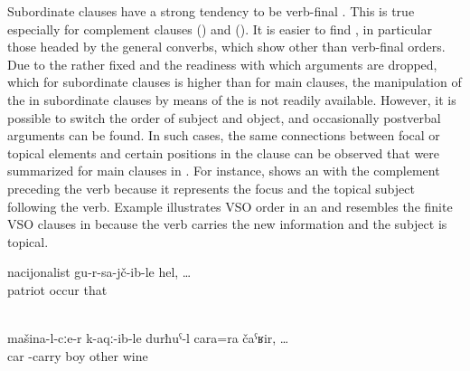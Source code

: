 Subordinate clauses have a strong tendency to be verb-final . This is true especially for complement clauses () and  (). It is easier to find , in particular those headed by the general converbs, which show other than verb-final orders. Due to the rather fixed  and the readiness with which arguments are dropped, which for subordinate clauses is higher than for main clauses, the manipulation of the  in subordinate clauses by means of the  is not readily available. However, it is possible to switch the order of subject and object, and occasionally postverbal arguments can be found. In such cases, the same connections between focal or topical elements and certain positions in the clause can be observed that were summarized for main clauses in . For instance,  shows an  with the  complement preceding the verb because it represents the focus and the topical subject following the verb. Example  illustrates VSO order in an  and resembles the finite VSO clauses in  because the verb carries the new information and the subject is topical.
%
\begin{exe}
	\ex	\label{ex:‎‎‎That (journalist) was a nationalist}
	\gll	nacijonalist	gu-r-sa-jč-ib-le	hel, \ldots\\
		patriot	occur	that\\
	\glt	{}

	\\\label{ex:‎The boy brought another (bottle of) wine from the car}
	\gll	mašina-l-cːe-r	k-aqː-ib-le	durħuˁ-l	cara=ra	čaˁʁir, \ldots\\
		car	-carry	boy	other	wine\\
	\glt	{}
\end{exe}


